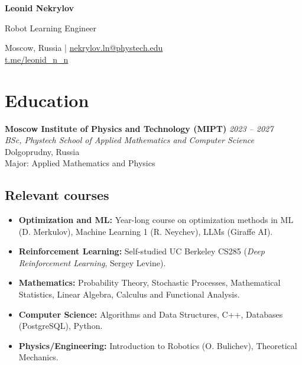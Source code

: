 \documentclass[10pt,a4paper]{article}
\begin{document}
\pagestyle{empty}
\begin{center}
{\LARGE \textbf{Leonid Nekrylov}}
\vspace{0.1cm}

{\large Robot Learning Engineer}
\vspace{0.2cm}

Moscow, Russia |
\href{mailto:nekrylov.ln@phystech.edu}{nekrylov.ln@phystech.edu}
\\
\href{https://t.me/leonid_n_n}{t.me/leonid\_n\_n}
\end{center}

\section*{Education}
\textbf{Moscow Institute of Physics and Technology (MIPT)} \hfill \textit{2023 -- 2027} \\
\textit{BSc, Phystech School of Applied Mathematics and Computer Science} \hfill Dolgoprudny, Russia \\
Major: Applied Mathematics and Physics

\subsection*{Relevant courses}
\vspace{0.1cm}
\begin{itemize}[leftmargin=*,nosep]
\item \textbf{Optimization and ML:} Year-long course on optimization methods in ML (D. Merkulov), Machine Learning 1 (R. Neychev), LLMs (Giraffe AI).
\item \textbf{Reinforcement Learning:} Self-studied UC Berkeley CS285 (\textit{Deep Reinforcement Learning}, Sergey Levine).
\item \textbf{Mathematics:} Probability Theory, Stochastic Processes, Mathematical Statistics, Linear Algebra, Calculus and Functional Analysis.
\item \textbf{Computer Science:} Algorithms and Data Structures, C++, Databases (PostgreSQL), Python.
\item \textbf{Physics/Engineering:} Introduction to Robotics (O. Bulichev), Theoretical Mechanics.
\end{itemize}
\end{document}
